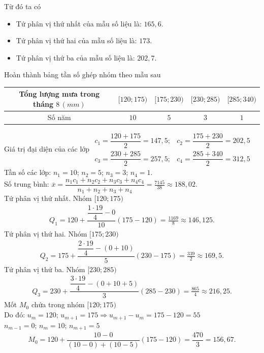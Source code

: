\begin{ex}
{\begin{listEX}
			Từ đó ta có 
			\begin{itemize}
				\item Tứ phân vị thứ nhất của mẫu  số liệu là: $165{,}6$.
				\item Tứ phân vị thứ hai  của mẫu số liệu là: $173$.
				\item Tứ phân vị thứ ba của mẫu  số liệu là: $202{,}7$.
			\end{itemize}
			\item Hoàn thành bảng  tần số ghép nhóm theo mẫu sau
			\begin{center}
				\begin{tabular}{|c|c|c|c|c|}
					\hline Tổng lượng mưa  trong tháng $8\, (mm)$ & $[120;175)$ & $[175;230)$ & $[230;285)$ & $[285;340)$ \\
					\hline Số năm  & $10$ & $5$ & $3$ & $1$ \\
					\hline 
				\end{tabular}
			\end{center}
			Giá trị đại diện của các  lớp
			$\begin{array}{ll}
			 c_{1}=\dfrac{120+175}{2}=147{,}5;& c_{2}=\dfrac{175+230}{2}=202{,}5 \\
			c_{3}=\dfrac{230+285}{2}=257{,}5;&  c_{4}=\dfrac{285+340}{2}=312{,}5
		\end{array}$ \\
		Tần  số các lớp: $n_{1}=10$; $n_{2}=5$; $n_{3}=3$; $n_{4}=1$.\\
		Số trung bình: $\overline{x}=\dfrac{n_{1} c_{1}+n_{2}  c_{2}+n_{3} c_{3}+n_{4} c_{4}}{n_{1}+n_{2}+n_{3}+n_{4}}=\frac{7145}{38} \approx 188{,}02$.\\
		Tứ phân vị thứ nhất.  Nhóm $[120;175)$
		\begin{eqnarray*}
			Q_{1}=120+\dfrac{\dfrac{1\cdot 19}{4}-0}{10}(175-120)=\frac{1169}{8} \approx 146{,}125. 
		\end{eqnarray*}
		Tứ phân  vị thứ hai. Nhóm $[175; 230)$
		\begin{eqnarray*}
			Q_{2}=175+\dfrac{\dfrac{2\cdot  19}{4}-(0+10)}{5}(230-175)=\frac{339}{2} \approx 169{,}5.
		\end{eqnarray*}
		Tứ  phân vị thứ ba. Nhóm $[230; 285)$
		\begin{eqnarray*}
			 Q_{3}=230+\dfrac{\dfrac{3\cdot 19}{4}-(0+10+5)}{3}(285-230)=\frac{865}{4} \approx 216{,}25.
		\end{eqnarray*}
		 Mốt $M_{0}$ chứa trong nhóm $[120;175)$\\
		 Do đó: $u_{m}=120$; $u_{m+1}=175 \Rightarrow u_{m+1}-u_{m}=175-120=55$\\
		$n_{m-1}=0$; $n_{m}=10$;  $n_{m+1}=5$
		\begin{eqnarray*}
			 M_{0}=120+\dfrac{10-0}{(10-0)+(10-5)}(175-120)=\dfrac{470}{3}=156{,}67.
		\end{eqnarray*}
	\end{listEX}
} 
\end{ex}

